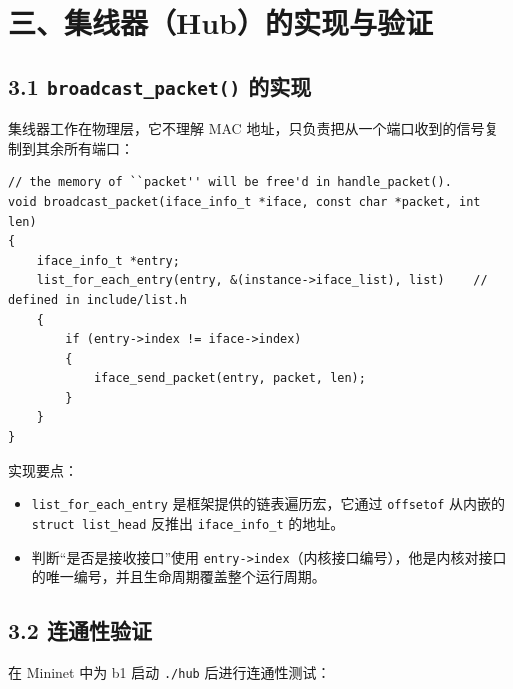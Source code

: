\documentclass[UTF8,12pt,a4paper,fontset=fandol]{ctexart}
\begin{document}
\section*{三、集线器（Hub）的实现与验证}

\subsection*{3.1 \texttt{broadcast_packet()} 的实现}

集线器工作在物理层，它不理解 MAC 地址，只负责把从一个端口收到的信号复制到其余所有端口：

\begin{verbatim}
// the memory of ``packet'' will be free'd in handle_packet().
void broadcast_packet(iface_info_t *iface, const char *packet, int len)
{
    iface_info_t *entry;
    list_for_each_entry(entry, &(instance->iface_list), list)    // defined in include/list.h
    {
        if (entry->index != iface->index)
        {
            iface_send_packet(entry, packet, len);
        }
    }
}
\end{verbatim}

实现要点：

\begin{itemize}[leftmargin=1.7em]
  \item \texttt{list_for_each_entry} 是框架提供的链表遍历宏，它通过 \texttt{offsetof} 从内嵌的 \texttt{struct list_head} 反推出 \texttt{iface_info_t} 的地址。
  \item 判断“是否是接收接口”使用 \texttt{entry->index}（内核接口编号），他是内核对接口的唯一编号，并且生命周期覆盖整个运行周期。
\end{itemize}

\subsection*{3.2 连通性验证}

在 Mininet 中为 b1 启动 \texttt{./hub} 后进行连通性测试：
\end{document}

